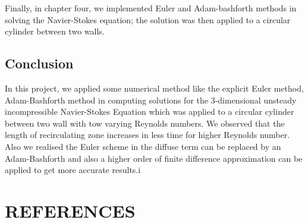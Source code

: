 \documentclass[11pt]{report}
\begin{document}
	Finally, in chapter four, we implemented Euler and Adam-bashforth methods in solving the Navier-Stokes equation; the solution was then applied to a circular cylinder between two walls.
	
	\section{Conclusion}
	In this project, we applied some numerical method like the explicit Euler method, Adam-Bashforth method in computing solutions for the 3-dimensional unsteady incompressible Navier-Stokes Equation which was applied to a circular cylinder between two wall with tow varying Reynolds numbers. We observed that the length of recirculating zone increases in less time for higher Reynolds number. Also we realised the Euler scheme in the diffuse term can be replaced by an Adam-Bashforth and also a higher order of finite difference approximation can be applied to get more accurate results.i
	

	
	\chapter*{REFERENCES}
	
\end{document}
